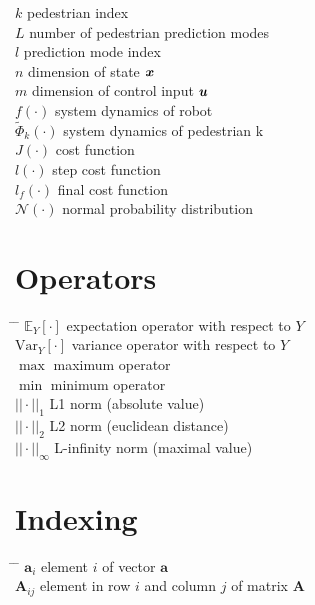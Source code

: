 \begin{tabbing}
$k$ \> pedestrian index \\[0.5ex]
$L$ \> number of pedestrian prediction modes \\[0.5ex]
$l$ \> prediction mode index \\[0.5ex]
$n$ \> dimension of state $\boldsymbol{x}$ \\[0.5ex]
$m$ \> dimension of control input $\boldsymbol{u}$ \\[0.5ex]
$f(\cdot)$ \> system dynamics of robot \\[0.5ex]
$\tilde{\Phi}_k(\cdot)$ \> system dynamics of pedestrian k \\[0.5ex]
$J(\cdot)$ \> cost function \\[0.5ex]
$l(\cdot)$ \> step cost function \\[0.5ex]
$l_f(\cdot)$ \> final cost function \\[0.5ex]
$\mathcal{N}(\cdot)$ \> normal probability distribution \\[0.5ex]
\end{tabbing}

\section*{Operators}
\begin{tabbing}
\hspace*{1.6cm} \= \hspace*{8cm} \= \kill
$\mathbb{E}_Y[\cdot]$ \> expectation operator with respect to $Y$ \\[0.5ex]
$\mathrm{Var}_Y[\cdot]$ \> variance operator with respect to $Y$ \\[0.5ex]
$\max$ \> maximum operator \\[0.5ex]
$\min$ \> minimum operator \\[0.5ex]
$||\cdot||_1$ \> L1 norm (absolute value) \\[0.5ex]
$||\cdot||_2$ \> L2 norm (euclidean distance) \\[0.5ex]
$||\cdot||_{\infty}$ \> L-infinity norm (maximal value) \\[0.5ex]
\end{tabbing}

\section*{Indexing}
\begin{tabbing}
\hspace*{1.6cm} \= \hspace*{8cm} \= \kill
$\mathbf{a}_i$ \> element $i$ of vector $\mathbf{a}$ \\[0.5ex]
$\mathbf{A}_{ij}$ \> element in row $i$ and column $j$ of matrix $\mathbf{A}$ \\[0.5ex]
\end{tabbing}


